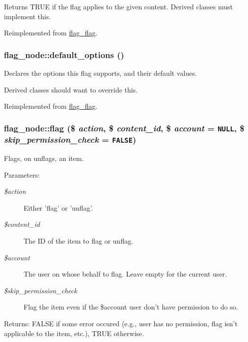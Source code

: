 Returns TRUE if the flag applies to the given content. Derived classes must implement this.

Reimplemented from \hyperlink{classflag__flag_55c4da8291aed979309f25ce09953092}{flag\_\-flag}.\hypertarget{classflag__node_e896b1a9f9ef4b26514c52540ec0ef70}{
\subsubsection[{default\_\-options}]{\setlength{\rightskip}{0pt plus 5cm}flag\_\-node::default\_\-options ()}}
\label{classflag__node_e896b1a9f9ef4b26514c52540ec0ef70}


Declares the options this flag supports, and their default values.

Derived classes should want to override this. 

Reimplemented from \hyperlink{classflag__flag_240678d55d61a16ef848ecc0cc3c609f}{flag\_\-flag}.\hypertarget{classflag__node_b9cba098ce624c77b20d67bf51ee8f4f}{
\subsubsection[{flag}]{\setlength{\rightskip}{0pt plus 5cm}flag\_\-node::flag (\$ {\em action}, \/  \$ {\em content\_\-id}, \/  \$ {\em account} = {\tt NULL}, \/  \$ {\em skip\_\-permission\_\-check} = {\tt FALSE})}}
\label{classflag__node_b9cba098ce624c77b20d67bf51ee8f4f}


Flags, on unflags, an item.

\begin{Desc}
\item[Parameters:]
\begin{description}
\item[{\em \$action}]Either 'flag' or 'unflag'. \item[{\em \$content\_\-id}]The ID of the item to flag or unflag. \item[{\em \$account}]The user on whose behalf to flag. Leave empty for the current user. \item[{\em \$skip\_\-permission\_\-check}]Flag the item even if the \$account user don't have permission to do so. \end{description}
\end{Desc}
\begin{Desc}
\item[Returns:]FALSE if some error occured (e.g., user has no permission, flag isn't applicable to the item, etc.), TRUE otherwise. \end{Desc}


